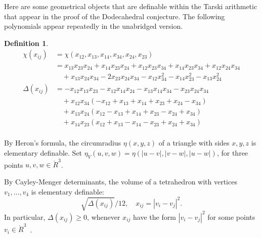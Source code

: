 \documentclass{article} %
\newtheorem{definition}[lemma]{Definition}
\begin{document}
Here are some geometrical 
objects that are definable within the Tarski arithmetic
that appear in the proof of the Dodecahedral conjecture.
The following polynomials appear repeatedly in the unabridged version.
\begin{definition}
$$
\begin{array}{lll}
 \chi(x_{ij}) &= \chi(x_{12},x_{13},x_{14},x_{34},x_{24},x_{23})\\
     &=
      x_{13} x_{23} x_{24} + x_{14} x_{23} x_{24}  + 
      x_{12} x_{23} x_{34} + x_{14} x_{23} x_{34} + x_{12} x_{24} x_{34}\\ 
      &\quad + x_{13} x_{24} x_{34} - 
      2 x_{23} x_{24} x_{34} - x_{12} x_{34}^2 
      - x_{14} x_{23}^2 - x_{13} x_{24}^2\\
[0.5ex]
\Delta(x_{ij}) &= 
   -x_{12} x_{13} x_{23} - x_{12} x_{14} x_{24} - x_{13} x_{14} x_{34} 
    - x_{23} x_{24} x_{34}\\
    &\quad + x_{12} x_{34} (-x_{12} + x_{13} + x_{14} + x_{23} + x_{24} - x_{34}) \\
  &\quad + x_{13} x_{24} (x_{12} - x_{13} + x_{14} + x_{23} - x_{24} + x_{34})\\
    &\quad + x_{14} x_{23} (x_{12} + x_{13} - x_{14} - x_{23} + x_{24} + x_{34})\\
\end{array}
\label{def:chi}
\label{def:tar:delta}
\label{def:ups}
$$
\end{definition}

By Heron's formula, the circumradius $\eta(x,y,z)$ of a triangle with sides $x,y,z$ is elementary definable.
Set $\eta_V(u,v,w) = \eta(|u-v|,|v-w|,|u-w|)$, for three points
$u,v,w\in\ring{R}^3$.

By Cayley-Menger determinants, the volume  of a tetrahedron with vertices $v_1,\ldots,v_4$ is elementary definable:
$$
\sqrt{\Delta(x_{ij})}/12,\quad x_{ij}=|v_i-v_j|^2.
$$
In particular, $\Delta(x_{ij})\ge0$, whenever $x_{ij}$ have
the form $|v_i-v_j|^2$ for some points
$v_i\in\ring{R}^3$~\cite[Lemma~8.1.4]{Hales:1997:DCG}.
\end{document}

